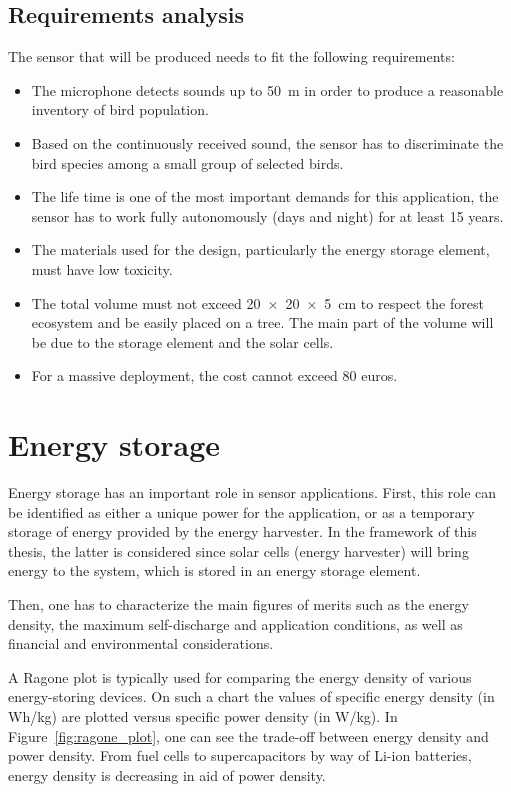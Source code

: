 \documentclass{EPL-master-thesis-covers-EN}
\begin{document}
\section{Requirements analysis}
\label{section:requirements}

The sensor that will be produced needs to fit the following requirements:

\begin{itemize}
 \item The microphone detects sounds up to \SI{50}{m} in order to produce a reasonable inventory of bird population. 
 \item Based on the continuously received sound, the sensor has to discriminate the bird species among a small group of selected birds.
 \item The life time is one of the most important demands for this application, the sensor has to work fully autonomously (days and night) for at least 15 years.
 \item The materials used for the design, particularly the energy storage element, must have low toxicity.
 \item The total volume must not exceed \SI{20 x 20 x 5}{cm} to respect the forest ecosystem and be easily placed on a tree. The main part of the volume will be due to the storage element and the solar cells.
 \item For a massive deployment, the cost cannot exceed 80 euros.
\end{itemize}



\chapter{Energy storage}

Energy storage has an important role in sensor applications. First, this role can be identified as either a unique power for the application, or as a temporary storage of energy provided by the energy harvester. In the framework of this thesis, the latter is considered since solar cells (energy harvester) will bring energy to the system, which is stored in an energy storage element.

Then, one has to characterize the main figures of merits such as the energy density, the maximum self-discharge and application conditions, as well as financial and environmental considerations.

A Ragone plot is typically used for comparing the energy density of various energy-storing devices. On such a chart the values of specific energy density (in \si{Wh/kg}) are plotted versus specific power density (in \si{W/kg}). In Figure~\ref{fig:ragone_plot}, one can see the trade-off between energy density and power density. From fuel cells to supercapacitors by way of Li-ion batteries, energy density is decreasing in aid of power density.
\end{document}
